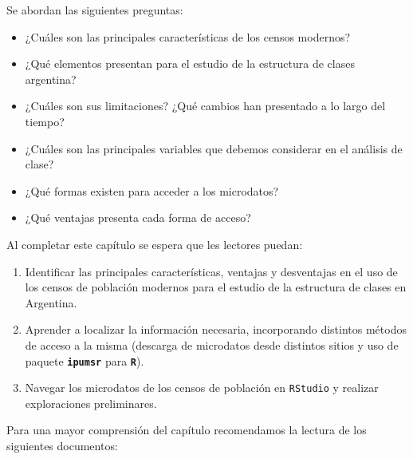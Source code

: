 \documentclass[
]{article}
\providecommand{\tightlist}{%
  \setlength{\itemsep}{0pt}\setlength{\parskip}{0pt}}
\begin{document}
Se abordan las siguientes preguntas:

\begin{itemize}
\tightlist
\item
  ¿Cuáles son las principales características de los censos modernos?
\item
  ¿Qué elementos presentan para el estudio de la estructura de clases argentina?
\item
  ¿Cuáles son sus limitaciones? ¿Qué cambios han presentado a lo largo del tiempo?
\item
  ¿Cuáles son las principales variables que debemos considerar en el análisis de clase?
\item
  ¿Qué formas existen para acceder a los microdatos?
\item
  ¿Qué ventajas presenta cada forma de acceso?
\end{itemize}

Al completar este capítulo se espera que les lectores puedan:

\begin{enumerate}
\def\labelenumi{\arabic{enumi}.}
\tightlist
\item
  Identificar las principales características, ventajas y desventajas en el uso de los censos de población modernos para el estudio de la estructura de clases en Argentina.
\item
  Aprender a localizar la información necesaria, incorporando distintos métodos de acceso a la misma (descarga de microdatos desde distintos sitios y uso de paquete \textbf{\texttt{ipumsr}} para \textbf{\texttt{R}}).
\item
  Navegar los microdatos de los censos de población en \texttt{RStudio} y realizar exploraciones preliminares.
\end{enumerate}

Para una mayor comprensión del capítulo recomendamos la lectura de los siguientes documentos:
\end{document}
